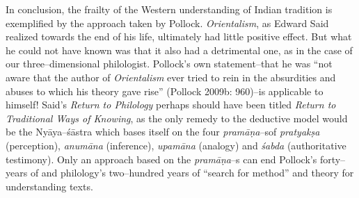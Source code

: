In conclusion, the frailty of the Western understanding of Indian tradition is exemplified by the approach taken by Pollock. \textit{Orientalism}, as Edward Said realized towards the end of his life, ultimately had little positive effect. But what he could not have known was that it also had a detrimental one, as in the case of our three–dimensional philologist. Pollock’s own statement–that he was “not aware that the author of \textit{Orientalism} ever tried to rein in the absurdities and abuses to which his theory gave rise” (Pollock 2009b: 960)–is applicable to himself! Said’s \textit{Return to Philology} perhaps should have been titled \textit{Return to Traditional Ways of Knowing}, as the only remedy to the deductive model would be the Nyāya–śāstra which bases itself on the four \textit{pramāṇa}–s\break of \textit{pratyakṣa} (perception), \textit{anumāna} (inference), \textit{upamāna} (analogy) and \textit{śabda} (authoritative testimony). Only an approach based on the \textit{pramāṇa}–s can end Pollock’s forty–years of and philology’s two–hundred years of “search for method” and theory for understanding texts.

